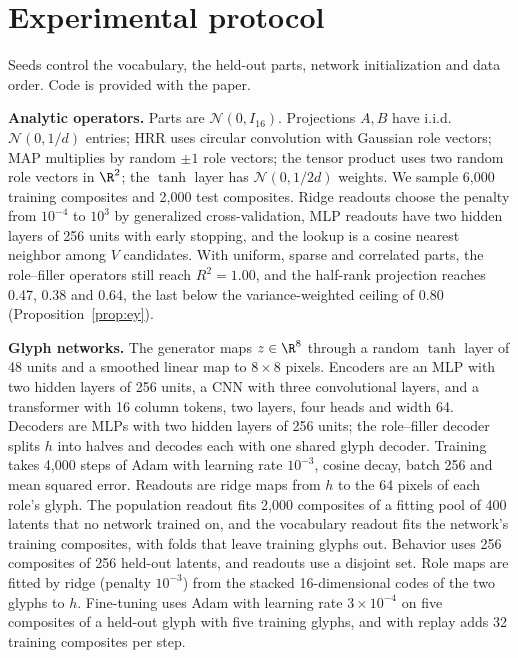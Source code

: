 \section{Experimental protocol}
\label{app:protocol}

Seeds control the vocabulary, the held-out parts, network initialization and data order. Code is provided with the paper.

\textbf{Analytic operators.} Parts are $\mathcal{N}(0, I_{16})$. Projections $A, B$ have i.i.d.\ $\mathcal{N}(0, 1/d)$ entries; HRR uses circular convolution with Gaussian role vectors; MAP multiplies by random $\pm 1$ role vectors; the tensor product uses two random role vectors in $\R^2$; the $\tanh$ layer has $\mathcal{N}(0, 1/2d)$ weights. We sample 6{,}000 training composites and 2{,}000 test composites. Ridge readouts choose the penalty from $10^{-4}$ to $10^{3}$ by generalized cross-validation, MLP readouts have two hidden layers of 256 units with early stopping, and the lookup is a cosine nearest neighbor among $V$ candidates. With uniform, sparse and correlated parts, the role--filler operators still reach $R^2 = 1.00$, and the half-rank projection reaches 0.47, 0.38 and 0.64, the last below the variance-weighted ceiling of 0.80 (Proposition~\ref{prop:ey}).

\textbf{Glyph networks.} The generator maps $z \in \R^8$ through a random $\tanh$ layer of 48 units and a smoothed linear map to $8 \times 8$ pixels. Encoders are an MLP with two hidden layers of 256 units, a CNN with three convolutional layers, and a transformer with 16 column tokens, two layers, four heads and width 64. Decoders are MLPs with two hidden layers of 256 units; the role--filler decoder splits $h$ into halves and decodes each with one shared glyph decoder. Training takes 4{,}000 steps of Adam with learning rate $10^{-3}$, cosine decay, batch 256 and mean squared error. Readouts are ridge maps from $h$ to the 64 pixels of each role's glyph. The population readout fits 2{,}000 composites of a fitting pool of 400 latents that no network trained on, and the vocabulary readout fits the network's training composites, with folds that leave training glyphs out. Behavior uses 256 composites of 256 held-out latents, and readouts use a disjoint set. Role maps are fitted by ridge (penalty $10^{-3}$) from the stacked 16-dimensional codes of the two glyphs to $h$. Fine-tuning uses Adam with learning rate $3 \times 10^{-4}$ on five composites of a held-out glyph with five training glyphs, and with replay adds 32 training composites per step.


